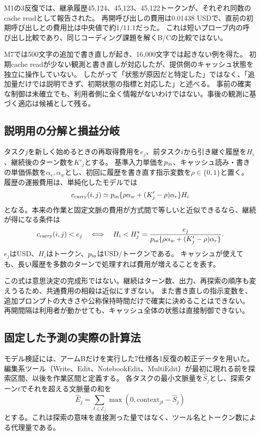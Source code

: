 \documentclass[a4paper,11pt]{article}
\begin{document}
M1の3反復では、継承履歴45,124、45,123、45,122トークンが、それぞれ同数のcache readとして報告された。
再開呼び出しの費用は0.01438 USDで、直前の初期呼び出しとの費用比は中央値で約$1/11.1$だった。
これは短いプローブ内の呼び出し比較であり、同じコーディング課題を解くB/Cの比較ではない。

M7では500文字の追加で書き直しが起き、16,000文字では起きない例を得た。
初期cache readが少ない観測と書き直しが対応したが、提供側のキャッシュ状態を独立に操作していない。
したがって「状態が原因だと特定した」ではなく、「追加量だけでは説明できず、初期状態の指標と対応した」と述べる。
事前の確実な制御は未確立でも、利用者側に全く情報がないわけではない。事後の観測に基づく適応は候補として残る。

\subsection{説明用の分解と損益分岐}
タスク$j$を新しく始めるときの再取得費用を$e_j$、前タスク$i$から引き継ぐ履歴を$H_i$、継続後のターン数を$K'_j$とする。
基準入力単価を$p_{\rm in}$、キャッシュ読み・書きの単価係数を$\alpha_r,\alpha_w$とし、初回に履歴を書き直す指示変数を$\rho\in\{0,1\}$と置く。
履歴の運搬費用は、単純化したモデルでは
\begin{equation}
c_{\rm carry}(i,j)\simeq p_{\rm in}\{\rho\alpha_w+(K'_j-\rho)\alpha_r\}H_i
\label{eq:carry}
\end{equation}
となる。本来の作業と固定文脈の費用が方式間で等しいと近似できるなら、継続が得になる条件は
\begin{equation}
c_{\rm carry}(i,j)<e_j
\quad\Longleftrightarrow\quad
H_i<H^*_j=\frac{e_j}{p_{\rm in}\{\rho\alpha_w+(K'_j-\rho)\alpha_r\}}.
\label{eq:breakeven}
\end{equation}
$e_j$はUSD、$H_i$はトークン、$p_{\rm in}$はUSD/トークンである。
キャッシュが使えても、長い履歴を多数のターンで処理すれば費用が増えることを表す。

この式は意思決定の完成形ではない。継続はターン数、出力、再探索の順序も変えうるため、共通費用の相殺は近似にすぎない。
また書き直しの指示変数を、追加プロンプトの大きさや公称保持時間だけで確実に決めることはできない。
再開間隔は利用者が動かせても、キャッシュ全体の状態は直接制御できない。

\subsection{固定した予測の実際の計算法}\label{sec:calibration}
モデル検証には、アームBだけを実行した7仕様各1反復の較正データを用いた。
編集系ツール（Write、Edit、NotebookEdit、MultiEdit）が最初に現れる前を探索区間、以後を作業区間と定義する。
各タスクの最小文脈量を$\widehat S_j$とし、探索ターン$t$でそれを超える文脈量の和を
\begin{equation}
\widehat E_j=\sum_{t\in\mathcal E_j}\max(0,\mathrm{context}_{jt}-\widehat S_j)
\end{equation}
とする。これは探索の意味を直接測った量ではなく、ツール名とトークン数による代理量である。
\end{document}
